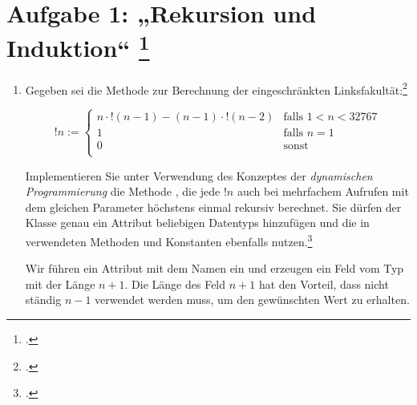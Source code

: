 \documentclass{lehramt-informatik-aufgabe}
\begin{document}
\let\m=\liInduktionMarkierung
\let\e=\liInduktionErklaerung
\def\lf#1{\text{lfLong}(#1)}
\def\sk#1{\sum^{#1}_{k=0}k!}


\section{Aufgabe 1: „Rekursion und Induktion“
\footcite[Thema 1 Aufgabe 1b Seite 2-3]{examen:66115:2014:03}}

\begin{enumerate}


\item Gegeben sei die Methode  zur
Berechnung der eingeschränkten Linksfakultät:\footcite[Seite
25]{aud:fs:1}

\begin{equation*}
!n :=
\begin{cases}
n \cdot !(n - 1) - (n - 1) \cdot !(n - 2) &
\text{falls } 1 < n < 32767 \\

1 &
\text{falls } n = 1 \\

0 &
\text{sonst } \\
\end{cases}
\end{equation*}


Implementieren Sie unter Verwendung des Konzeptes der \emph{dynamischen
Programmierung} die Methode , die
jede $!n$ auch bei mehrfachem Aufrufen mit dem gleichen Parameter
höchstens einmal rekursiv berechnet. Sie dürfen der Klasse
 genau ein Attribut beliebigen Datentyps
hinzufügen und die in  verwendeten Methoden und
Konstanten ebenfalls nutzen.\footcite[Aufgabe 5]{aud:pu:1}

\begin{liAntwort}
Wir führen ein Attribut mit dem Namen  ein und
erzeugen ein Feld vom Typ  mit der Länge $n+1$.
Die Länge des Feld $n+1$ hat den Vorteil, dass nicht ständig $n-1$
verwendet werden muss, um den gewünschten Wert zu erhalten.


\end{liAntwort}
\end{enumerate}
\end{document}
